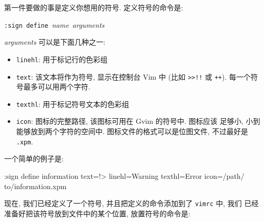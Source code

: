 第一件要做的事是定义你想用的符号. 定义符号的命令是:
\begin{vimcmdform}
\texttt{:sign define}\ \textit{name}\ \textit{arguments}
\end{vimcmdform}
\textit{arguments} 可以是下面几种之一:
\begin{itemize}
    \item \texttt{linehl}: 用于标记行的色彩组
    \item \texttt{text}: 该文本将作为符号, 显示在控制台 Vim 中 (比如
        \texttt{>>!!} 或 \texttt{++}). 每一个符号最多可以用两个字符.
    \item \texttt{texthl}: 用于标记符号文本的色彩组
    \item \texttt{icon}: 图标的完整路径, 该图标可用在 Gvim 的符号中. 图标应该
        足够小, 小到能够放到两个字符的空间中. 图标文件的格式可以是位图文件,
        不过最好是 \texttt{.xpm}.
\end{itemize}
一个简单的例子是:
\begin{vimcode}
:sign define information text=!> linehl=Warning texthl=Error icon=/path/
to/information.xpm
\end{vimcode}
现在, 我们已经定义了一个符号, 并且把定义的命令添加到了 \texttt{vimrc} 中, 我们
已经准备好把该符号放到文件中的某个位置, 放置符号的命令是:
